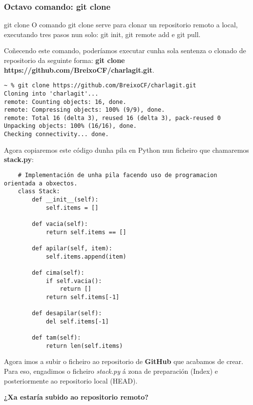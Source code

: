 \begin{frame}[fragile]
  \frametitle{Octavo comando: git clone}
  \begin{block}{git clone}
    O comando git clone serve para clonar un repositorio remoto a local, executando tres pasos nun solo: git init, git remote add e git pull.
  \end{block}
  Coñecendo este comando, poderíamos executar cunha sola sentenza o clonado de
  repositorio da seguinte forma: \textbf{git clone
    https://github.com/BreixoCF/charlagit.git}.
\begin{verbatim}
~ % git clone https://github.com/BreixoCF/charlagit.git
Cloning into 'charlagit'...
remote: Counting objects: 16, done.
remote: Compressing objects: 100% (9/9), done.
remote: Total 16 (delta 3), reused 16 (delta 3), pack-reused 0
Unpacking objects: 100% (16/16), done.
Checking connectivity... done.
\end{verbatim}
\end{frame}

\begin{frame}[fragile]
  \scriptsize
  Agora copiaremos este código dunha pila en Python nun ficheiro que chamaremos \textbf{stack.py}:
  \tiny
\begin{verbatim}
	# Implementación de unha pila facendo uso de programacion orientada a obxectos.
	class Stack:
	    def __init__(self):
	        self.items = []
	
	    def vacia(self):
	        return self.items == []
	
	    def apilar(self, item):
	        self.items.append(item)
	
	    def cima(self):
	        if self.vacia():
	            return []
	        return self.items[-1]
	
	    def desapilar(self):
	        del self.items[-1]
	
	    def tam(self):
	        return len(self.items)
\end{verbatim}
\end{frame}

\begin{frame}
  \normalsize
  Agora imos a subir o ficheiro ao repositorio de \textbf{GitHub} que acabamos de crear. Para eso, engadimos o ficheiro \textit{stack.py} á zona de preparación (Index) e posteriormente ao repositorio local (HEAD).\\
  \vspace{2cm}
  \large
  \begin{center}
    \textbf{¿Xa estaría subido ao repositorio remoto?}
  \end{center}
\end{frame}

